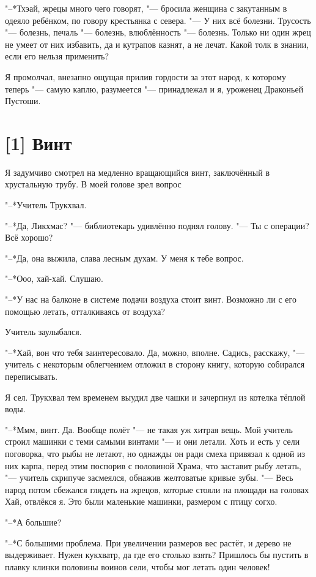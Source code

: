 "--*Тхэай, жрецы много чего говорят, "--- бросила женщина с закутанным в одеяло ребёнком, по говору крестьянка с севера.
"--- У них всё болезни.
Трусость "--- болезнь, печаль "--- болезнь, влюблённость "--- болезнь.
Только ни один жрец не умеет от них избавить, да и кутрапов казнят, а не лечат.
Какой толк в знании, если его нельзя применить?

Я промолчал, внезапно ощущая прилив гордости за этот народ, к которому теперь "--- самую каплю, разумеется "--- принадлежал и я, уроженец Драконьей Пустоши.

\section{[1] Винт}

Я задумчиво смотрел на медленно вращающийся винт, заключённый в хрустальную трубу. В моей голове зрел вопрос\ldotst

"--*Учитель Трукхвал.

"--*Да, Ликхмас? "--- библиотекарь удивлённо поднял голову.
"--- Ты с операции?
Всё хорошо?

"--*Да, она выжила, слава лесным духам.
У меня к тебе вопрос.

"--*Ооо, хай-хай.
Слушаю.

"--*У нас на балконе в системе подачи воздуха стоит винт.
Возможно ли с его помощью летать, отталкиваясь от воздуха?

Учитель заулыбался.

"--*Хай, вон что тебя заинтересовало.
Да, можно, вполне.
Садись, расскажу, "--- учитель с некоторым облегчением отложил в сторону книгу, которую собирался переписывать.

Я сел.
Трукхвал тем временем выудил две чашки и зачерпнул из котелка тёплой воды.

"--*Ммм, винт.
Да.
Вообще полёт "--- не такая уж хитрая вещь.
Мой учитель строил машинки с теми самыми винтами "--- и они летали.
Хоть и есть у сели поговорка, что рыбы не летают, но однажды он ради смеха привязал к одной из них карпа, перед этим поспорив с половиной Храма, что заставит рыбу летать, "--- учитель скрипуче засмеялся, обнажив желтоватые кривые зубы.
"--- Весь народ потом сбежался глядеть на жрецов, которые стояли на площади на головах\ldotst
Хай, отвлёкся я.
Это были маленькие машинки, размером с птицу согхо.

"--*А большие?

"--*С большими проблема.
При увеличении размеров вес растёт, и дерево не выдерживает.
Нужен кукхватр, да где его столько взять?
Пришлось бы пустить в плавку клинки половины воинов сели, чтобы мог летать один человек!

